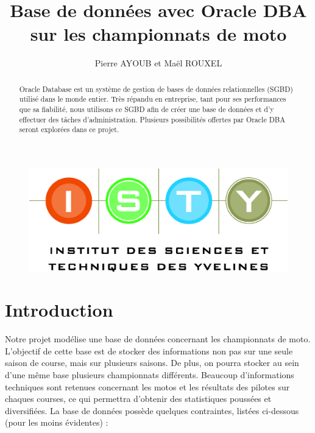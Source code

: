 \documentclass[12pt,a4paper]{article}
\begin{document}
\title{Base de données avec Oracle DBA sur les championnats de moto}
\author{Pierre AYOUB et Maël ROUXEL}

\maketitle

\begin{figure}[b]
    \centering
    \includegraphics[scale=0.3]{figures/isty.jpg}
\end{figure}

\newpage
\begin{abstract}
    
Oracle Database est un système de gestion de bases de données relationnelles
(SGBD) utilisé dans le monde entier. Très répandu en entreprise, tant pour
ses performances que sa fiabilité, nous utilisons ce SGBD afin de créer une
base de données et d’y effectuer des tâches d’administration. Plusieurs
possibilités offertes par Oracle DBA seront explorées dans ce projet.
    
\end{abstract}

\tableofcontents

\section{Introduction}
\label{sec.intro}

Notre projet modélise une base de données concernant les championnats de moto.
L’objectif de cette base est de stocker des informations non pas sur une seule
saison de course, mais sur plusieurs saisons. De plus, on pourra stocker au sein
d’une même base plusieurs championnats différents. Beaucoup d'informations
techniques sont retenues concernant les motos et les résultats des pilotes sur
chaques courses, ce qui permettra d’obtenir des statistiques poussées et
diversifiées. La base de données possède quelques contraintes, listées
ci-dessous (pour les moins évidentes) :
\end{document}
